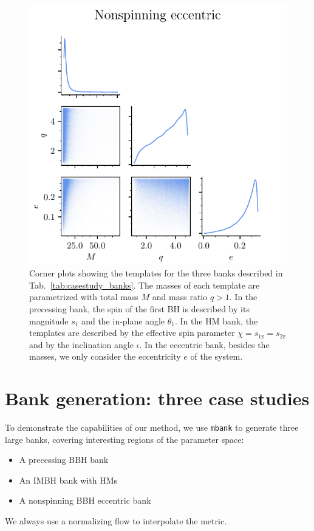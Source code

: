 \documentclass[twocolumn,showpacs,preprintnumbers,nofootinbib,prd,
superscriptaddress,10pt]{revtex4-2}
\begin{document}
\begin{figure}[t]
	\includegraphics[scale = 0.7]{bank_scatter_Nonspinning_eccentric}
	\caption{Corner plots showing the templates for the three banks described in Tab.~\ref{tab:casestudy_banks}. The masses of each template are parametrized with total mass $M$ and mass ratio $q>1$. In the precessing bank, the spin of the first BH is described by its magnitude $s_1$ and the in-plane angle $\theta_1$. In the HM bank, the templates are described by the effective spin parameter $\chi = s_\text{1z} = s_\text{2z}$ and by the inclination angle $\iota$. In the eccentric bank, besides the masses, we only consider the eccentricity $e$ of the system.}
	\label{fig:bank_scatter}
\end{figure}

\section{Bank generation: three case studies} \label{sec:bank_generation}

To demonstrate the capabilities of our method, we use \texttt{mbank} to generate three large banks, covering interesting regions of the parameter space:
	\begin{itemize}
		\item A precessing BBH bank
		\item An IMBH bank with HMs
		\item A nonspinning BBH eccentric bank
	\end{itemize}
We always use a normalizing flow to interpolate the metric.
\end{document}
